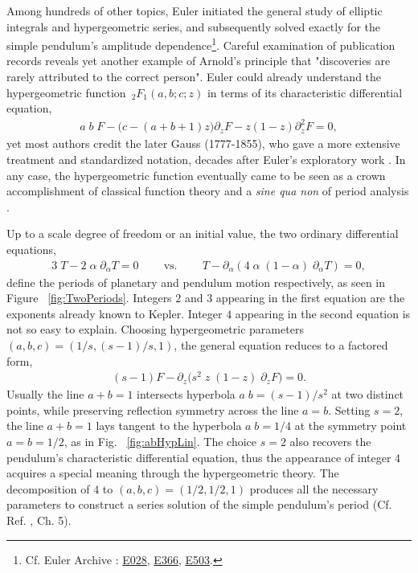 \documentclass[nofootinbib,preprint]{revtex4-1}
\begin{document}
Among hundreds of other topics, Euler initiated the general study of elliptic integrals and 
hypergeometric series, and subsequently solved exactly for the simple pendulum's amplitude 
dependence\footnote{Cf. Euler Archive \cite{EULER2019}:  
\href{http://eulerarchive.maa.org/pages/E028.html}{E028}, 
\href{http://eulerarchive.maa.org/pages/E366.html}{E366},
\href{http://eulerarchive.maa.org/pages/E503.html}{E503}.}. Careful 
examination of publication records reveals yet another example of Arnold's principle that 
"discoveries are rarely attributed to the correct person". Euler could already understand 
the hypergeometric function $\,_2 F_1(a,b;c;z)$ in terms of its characteristic differential 
equation, 
\begin{eqnarray}
a \;b\; F - \big(c-(a+b+1)z\big) \partial_{z}F - z(1-z)\partial_{z}^2 F = 0,  \nonumber
\end{eqnarray}
yet most authors credit the later Gauss (1777-1855), who gave a more extensive treatment 
and standardized notation, decades after Euler's exploratory work \cite{DUTKA84}. In any case, 
the hypergeometric function eventually came to be seen as a crown accomplishment of classical 
function theory and a \textit{sine qua non} of period analysis \cite{KZ2001}. 

Up to a scale degree of freedom or an initial value, the two ordinary 
differential equations,
\begin{eqnarray}
3\;T-2\;\alpha \;\partial_{\alpha}T=0 \;\;\;\;\;\;\;\; \text{vs.} \nonumber
 \;\;\;\;\;\;\;\; T-\partial_{\alpha}(4\;\alpha\;(1-\alpha)\;\partial_{\alpha}T)=0,
\end{eqnarray}
define the periods of planetary and pendulum motion respectively, as seen in Figure ~\ref{fig:TwoPeriods}.  
Integers $2$ and $3$ appearing in the first equation are the exponents already known to Kepler. 
Integer $4$ appearing in the second equation is not so easy to explain. Choosing hypergeometric parameters 
$(a,b,c)=(1/s,(s-1)/s,1)$, the general equation reduces to a factored form,
\begin{eqnarray}
(s-1)F-\partial_{z}\big(s^{2}\;z\;(1-z)\;\partial_{z}F\big)=0. \nonumber
\end{eqnarray}
Usually the line $a+b=1$ intersects hyperbola $a\;b=(s-1)/s^2$ at two distinct points, 
while preserving reflection symmetry across the line $a=b$. Setting $s=2$, the line $a+b=1$ 
lays tangent to the hyperbola $a\;b=1/4$ at the symmetry point $a=b=1/2$, as in Fig.
~\ref{fig:abHypLin}. The choice $s=2$ also recovers the pendulum's characteristic 
differential equation, thus the appearance of integer $4$ acquires a special meaning 
through the hypergeometric theory. The decomposition of $4$ to $(a,b,c)=(1/2,1/2,1)$ 
produces all the necessary parameters to construct a series solution of the simple 
pendulum's period (Cf. Ref. \cite{GRAHAM1994}, Ch. 5).
\end{document}
